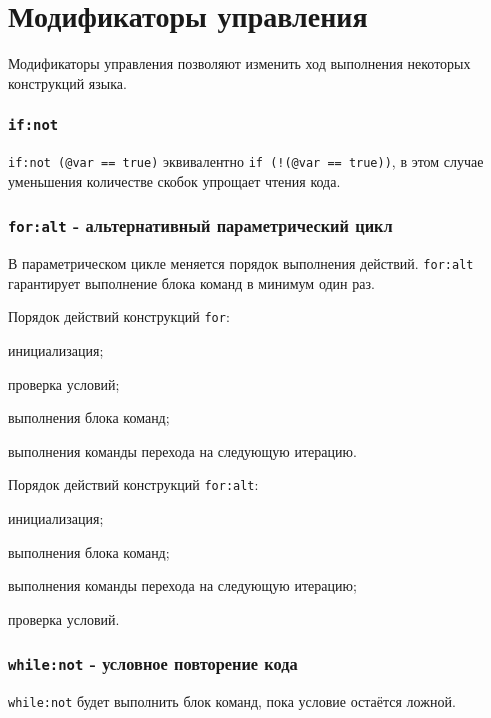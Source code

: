 
\section{Модификаторы управления}

Модификаторы управления позволяют изменить ход выполнения некоторых конструкций языка.

\subsubsection{\lstinline|if:not|}

\lstinline|if:not (@var == true)| эквивалентно \lstinline|if (!(@var == true))|, в этом случае уменьшения количестве скобок упрощает чтения кода.

\subsubsection{\lstinline|for:alt| - альтернативный параметрический цикл}

В параметрическом цикле меняется порядок выполнения действий. \lstinline|for:alt| гарантирует выполнение блока команд в минимум один раз.

Порядок действий конструкций \lstinline|for|:
\begin{icEnum}
    \item инициализация;
	\item проверка условий;
	\item выполнения блока команд;
	\item выполнения команды перехода на следующую итерацию.
\end{icEnum}

Порядок действий конструкций \lstinline|for:alt|:
\begin{icEnum}
    \item инициализация;
	\item выполнения блока команд;
	\item выполнения команды перехода на следующую итерацию;
	\item проверка условий.
\end{icEnum}

\subsubsection{\lstinline|while:not| - условное повторение кода}

\lstinline|while:not| будет выполнить блок команд, пока условие остаётся ложной.

